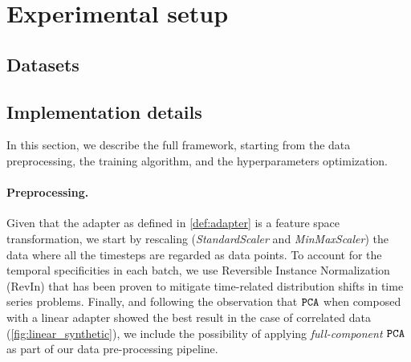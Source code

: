 \section{Experimental setup}
\label{appendix:exp_setup}

\subsection{Datasets}
\label{appendix:datasets}

\begin{table}[htbp]
    \centering
    \caption{Characteristics of the multivariate time series datasets used in our experiments with various sizes and dimensions.}
    \label{tab:dataset_description}
\end{table}

\subsection{Implementation details}
\label{appendix:implem}

In this section, we describe the full \adapts framework, starting from the data preprocessing, the training algorithm, and the hyperparameters optimization.

\paragraph{Preprocessing.} Given that the adapter as defined in \cref{def:adapter} is a feature space transformation, we start by rescaling (\emph{StandardScaler} and \emph{MinMaxScaler}) the data where all the timesteps are regarded as data points. To account for the temporal specificities in each batch, we use Reversible Instance Normalization (RevIn) \citep{kim2022reversible} that has been proven to mitigate time-related distribution shifts in time series problems. Finally, and following the observation that $\texttt{PCA}$ when composed with a linear adapter showed the best result in the case of correlated data (\cref{fig:linear_synthetic}), we include the possibility of applying \emph{full-component} $\texttt{PCA}$ as part of our data pre-processing pipeline.

